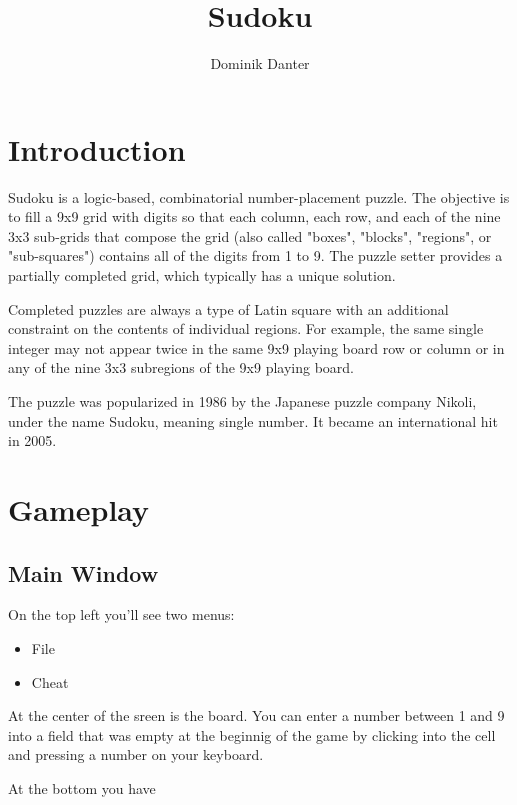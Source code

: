 \documentclass[a4paper,11pt]{article}
\title{Sudoku}
\author{Dominik Danter}
\begin{document}
\maketitle
\tableofcontents

\begin{abstract}
\end{abstract}

\section{Introduction}
Sudoku is a logic-based, combinatorial number-placement puzzle. The objective is to fill a 9x9 grid with digits so that each column, each row, and each of the nine 3x3 sub-grids that compose the grid (also called "boxes", "blocks", "regions", or "sub-squares") contains all of the digits from 1 to 9. The puzzle setter provides a partially completed grid, which typically has a unique solution.

Completed puzzles are always a type of Latin square with an additional constraint on the contents of individual regions. For example, the same single integer may not appear twice in the same 9x9 playing board row or column or in any of the nine 3x3 subregions of the 9x9 playing board.

The puzzle was popularized in 1986 by the Japanese puzzle company Nikoli, under the name Sudoku, meaning single number. It became an international hit in 2005.
\cite{wikipedia}

\section{Gameplay}

\subsection{Main Window} 


On the top left you'll see two menus:

\begin{itemize}
  \item File
  \item Cheat
\end{itemize}

At the center of the sreen is the board. You can enter a number between 1 and 9 into a field that was empty at the beginnig of the game by clicking into the cell and pressing a number on your keyboard. 

At the bottom you have 
\end{document}
